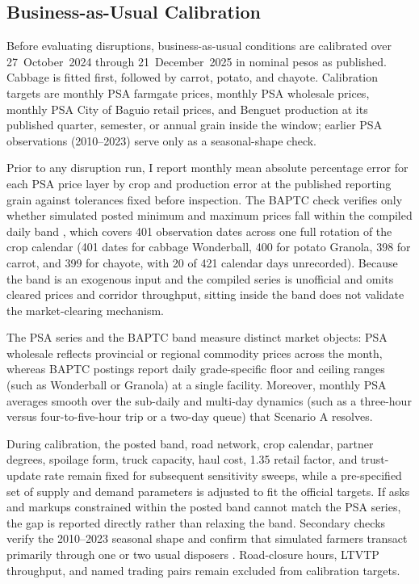 \documentclass{icsthesis}
\begin{document}
\begin{mainmatter}
		\subsection{Business-as-Usual Calibration}

			Before evaluating disruptions, business-as-usual conditions are calibrated over 27~October~2024 through 21~December~2025 in nominal pesos as published. Cabbage is fitted first, followed by carrot, potato, and chayote. Calibration targets are monthly PSA farmgate prices, monthly PSA wholesale prices, monthly PSA City of Baguio retail prices, and Benguet production at its published quarter, semester, or annual grain inside the window; earlier PSA observations (2010--2023) serve only as a seasonal-shape check.

			Prior to any disruption run, I report monthly mean absolute percentage error for each PSA price layer by crop and production error at the published reporting grain against tolerances fixed before inspection. The BAPTC check verifies only whether simulated posted minimum and maximum prices fall within the compiled daily band \citep{AgriTrakPH2025}, which covers 401 observation dates across one full rotation of the crop calendar (401 dates for cabbage Wonderball, 400 for potato Granola, 398 for carrot, and 399 for chayote, with 20 of 421 calendar days unrecorded). Because the band is an exogenous input and the compiled series is unofficial and omits cleared prices and corridor throughput, sitting inside the band does not validate the market-clearing mechanism.

			The PSA series and the BAPTC band measure distinct market objects: PSA wholesale reflects provincial or regional commodity prices across the month, whereas BAPTC postings report daily grade-specific floor and ceiling ranges (such as Wonderball or Granola) at a single facility. Moreover, monthly PSA averages smooth over the sub-daily and multi-day dynamics (such as a three-hour versus four-to-five-hour trip or a two-day queue) that Scenario A resolves.

			During calibration, the posted band, road network, crop calendar, partner degrees, spoilage form, truck capacity, haul cost, 1.35 retail factor, and trust-update rate remain fixed for subsequent sensitivity sweeps, while a pre-specified set of supply and demand parameters is adjusted to fit the official targets. If asks and markups constrained within the posted band cannot match the PSA series, the gap is reported directly rather than relaxing the band. Secondary checks verify the 2010--2023 seasonal shape and confirm that simulated farmers transact primarily through one or two usual disposers \citep{deGuzmanBambicoBaconguis2023}. Road-closure hours, LTVTP throughput, and named trading pairs remain excluded from calibration targets.


\end{mainmatter}
\end{document}
